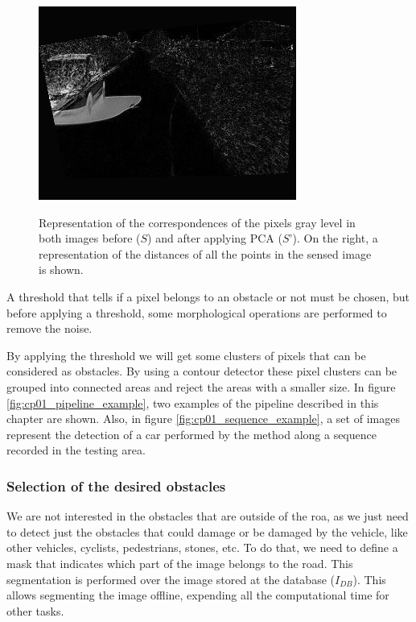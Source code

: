 \begin{figure}[h!]
\begin{minipage}{0.3\textwidth}
\end{minipage}
\begin{minipage}{0.3\textwidth}
    \centering
    \includegraphics[width=\textwidth]{pca3}\label{fig:cp01_pca3}
\end{minipage}
\caption{Representation of the correspondences of the pixels gray level in both images before ($S$) and after applying PCA ($S’$). On the right, a representation of the distances of all the points in the sensed image is shown.}\label{fig:cp01_pca}
\end{figure}

A threshold that tells if a pixel belongs to an obstacle or not must be chosen, but before applying a threshold, some morphological operations are performed to remove the noise.

By applying the threshold we will get some clusters of pixels that can be considered as obstacles. By using a contour detector these pixel clusters can be grouped into connected areas and reject the areas with a smaller size. In figure \ref{fig:cp01_pipeline_example}, two examples of the pipeline described in this chapter are shown. Also, in figure \ref{fig:cp01_sequence_example}, a set of images represent the detection of a car performed by the method along a sequence recorded in the testing area.

\subsubsection{Selection of the desired obstacles}\label{ch:chapter01_01_03_03}

We are not interested in the obstacles that are outside of the roa, as we just need to detect just the obstacles that could damage or be damaged by the vehicle, like other vehicles, cyclists, pedestrians, stones, etc. To do that, we need to define a mask that indicates which part of the image belongs to the road. This segmentation is performed over the image stored at the database ($I_{DB}$). This allows segmenting the image offline, expending all the computational time for other tasks.

